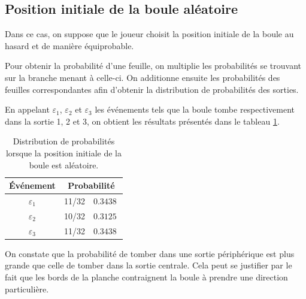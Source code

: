 \documentclass[a4paper, 12pt]{article}
\begin{document}
	\subsection{Position initiale de la boule aléatoire}
	Dans ce cas, on suppose que le joueur choisit la position initiale de la boule au hasard et de manière équiprobable.\par
	
	Pour obtenir la probabilité d'une feuille, on multiplie les probabilités se trouvant sur la branche menant à celle-ci. On additionne ensuite les probabilités des feuilles correspondantes afin d'obtenir la distribution de probabilités des sorties.\par
	En appelant \(\varepsilon_1\), \(\varepsilon_2\) et \(\varepsilon_3\) les événements tels que la boule tombe respectivement dans la sortie 1, 2 et 3, on obtient les résultats présentés dans le tableau \ref{table:tab_Q1a}.\par
	\begin{table}[!h]
        \centering
        \begin{tabular}{|c|c|c|}
            \hline
            \textbf{Événement} & \multicolumn{2}{c|}{\textbf{Probabilité}}\\
            \hline
            \hline
            \(\varepsilon_1\) & 11/32 & \(\SI{0.3438}{}\)\\
            \hline
            \(\varepsilon_2\) & 10/32 & \(\SI{0.3125}{}\)\\
            \hline
            \(\varepsilon_3\) & 11/32 & \(\SI{0.3438}{}\)\\
            \hline
        \end{tabular}
        \caption{Distribution de probabilités lorsque la position initiale de la boule est aléatoire.}
        \label{table:tab_Q1a}
    \end{table}
    On constate que la probabilité de tomber dans une sortie périphérique est plus grande que celle de tomber dans la sortie centrale. Cela peut se justifier par le fait que les bords de la planche contraignent la boule à prendre une direction particulière.
\end{document}
